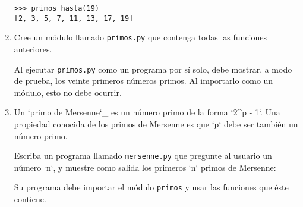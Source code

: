 \begin{enumerate}
\begin{lstlisting}
>>> primos_hasta(19)
[2, 3, 5, 7, 11, 13, 17, 19]
\end{lstlisting}
\item
  Cree un módulo llamado \lstinline!primos.py! que contenga todas las
  funciones anteriores.

  Al ejecutar \lstinline!primos.py! como un programa por sí solo, debe
  mostrar, a modo de prueba, los veinte primeros números primos. Al
  importarlo como un módulo, esto no debe ocurrir.
\item
  Un `primo de Mersenne`\_ es un número primo de la forma `2\^{}p - 1`.
  Una propiedad conocida de los primos de Mersenne es que `p` debe ser
  también un número primo.

  Escriba un programa llamado \lstinline!mersenne.py! que pregunte al
  usuario un número `n`, y muestre como salida los primeros `n` primos
  de Mersenne:

  Su programa debe importar el módulo \lstinline!primos! y usar las
  funciones que éste contiene.
\end{enumerate}
